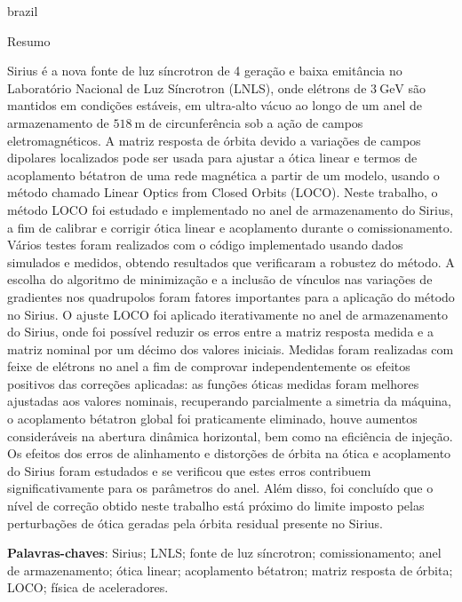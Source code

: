 \begin{otherlanguage*}{brazil}
\renewcommand{\sfdefault}{\rmdefault}
    \begin{center}{\ABNTEXchapterfont\huge Resumo}\end{center}
    
    Sirius é a nova fonte de luz síncrotron de 4 geração e baixa emitância no Laboratório Nacional de Luz Síncrotron (LNLS), onde elétrons de $\SI{3}{\giga\electronvolt}$ são mantidos em condições estáveis, em ultra-alto vácuo ao longo de um anel de armazenamento de $\SI{518}{\meter}$ de circunferência sob a ação de campos eletromagnéticos. A matriz resposta de órbita devido a variações de campos dipolares localizados pode ser usada para ajustar a ótica linear e termos de acoplamento bétatron de uma rede magnética a partir de um modelo, usando o método chamado Linear Optics from Closed Orbits (LOCO). Neste trabalho, o método LOCO foi estudado e implementado no anel de armazenamento do Sirius, a fim de calibrar e corrigir ótica linear e acoplamento durante o comissionamento. Vários testes foram realizados com o código implementado usando dados simulados e medidos, obtendo resultados que verificaram a robustez do método. A escolha do algoritmo de minimização e a inclusão de vínculos nas variações de gradientes nos quadrupolos foram fatores importantes para a aplicação do método no Sirius. O ajuste LOCO foi aplicado iterativamente no anel de armazenamento do Sirius, onde foi possível reduzir os erros entre a matriz resposta medida e a matriz nominal por um décimo dos valores iniciais. Medidas foram realizadas com feixe de elétrons no anel a fim de comprovar independentemente os efeitos positivos das correções aplicadas: as funções óticas medidas foram melhores ajustadas aos valores nominais, recuperando parcialmente a simetria da máquina, o acoplamento bétatron global foi praticamente eliminado, houve aumentos consideráveis na abertura dinâmica horizontal, bem como na eficiência de injeção. Os efeitos dos erros de alinhamento e distorções de órbita na ótica e acoplamento do Sirius foram estudados e se verificou que estes erros contribuem significativamente para os parâmetros do anel. Além disso, foi concluído que o nível de correção obtido neste trabalho está próximo do limite imposto pelas perturbações de ótica geradas pela órbita residual presente no Sirius.
    
    \vspace{\onelineskip}
    \noindent\textbf{Palavras-chaves}: Sirius; LNLS; fonte de luz síncrotron; comissionamento; anel de armazenamento; ótica linear; acoplamento bétatron; matriz resposta de órbita; LOCO; física de aceleradores.
    \vspace{\fill}
\end{otherlanguage*}
\cleardoublepage

